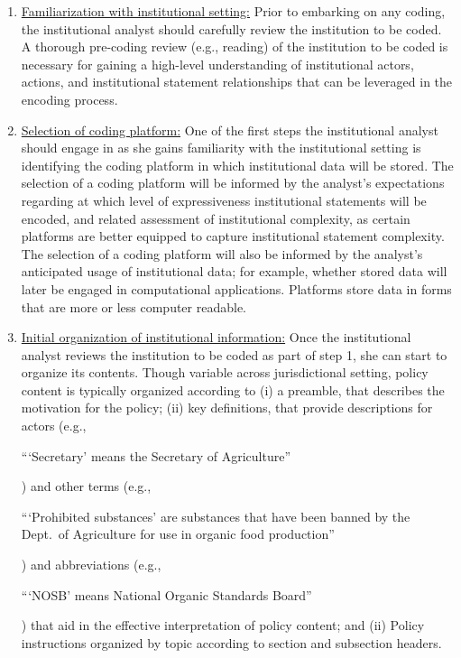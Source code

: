 \begin{enumerate}
    \item \underline{Familiarization with institutional setting:} Prior to embarking on any coding, the institutional analyst should carefully review the institution to be coded. A thorough pre-coding review (e.g., reading) of the institution to be coded is necessary for gaining a high-level understanding of institutional actors, actions, and institutional statement relationships that can be leveraged in the encoding process.
    
    \item \underline{Selection of coding platform:} One of the first steps the institutional analyst should engage in as she gains familiarity with the institutional setting is identifying the coding platform in which institutional data will be stored. The selection of a coding platform will be informed by the analyst’s expectations regarding at which level of expressiveness institutional statements will be encoded, and related assessment of institutional complexity, as certain platforms are better equipped to capture institutional statement complexity. The selection of a coding platform will also be informed by the analyst’s anticipated usage of institutional data; for example, whether stored data will later be engaged in computational applications. Platforms store data in forms that are more or less computer readable. 
    
    \item \underline{Initial organization of institutional information:} Once the institutional analyst reviews the institution to be coded as part of step 1, she can start to organize its contents. Though variable across jurisdictional setting, policy content is typically organized according to (i) a preamble, that describes the motivation for the policy; (ii) key definitions, that provide descriptions for actors (e.g., \begin{exi}```Secretary' means the Secretary of Agriculture''\end{exi}) and other terms (e.g., \begin{exi}```Prohibited substances' are substances that have been banned by the Dept.~of Agriculture for use in organic food production''\end{exi}) and abbreviations (e.g., \begin{exi}```NOSB' means National Organic Standards Board''\end{exi}) that aid in the effective interpretation of policy content; and (ii) Policy instructions organized by topic according to section and subsection headers. 


\end{enumerate}
